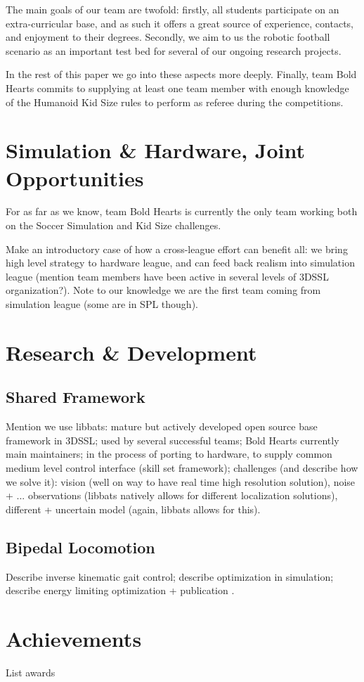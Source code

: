 \documentclass{llncs}
\begin{document}
The main goals of our team are twofold: firstly, all students
participate on an extra-curricular base, and as such it offers a great
source of experience, contacts, and enjoyment to their
degrees. Secondly, we aim to us the robotic football scenario as an
important test bed for several of our ongoing research projects.

In the rest of this paper we go into these aspects more
deeply. Finally, team Bold Hearts commits to supplying at least one
team member with enough knowledge of the Humanoid Kid Size rules to
perform as referee during the competitions.

\section{Simulation \& Hardware, Joint Opportunities}
\label{sec:simul-amp-hardw}

For as far as we know, team Bold Hearts is currently the only team
working both on the Soccer Simulation and Kid Size challenges. 

Make an introductory case of how a cross-league effort can benefit
all: we bring high level strategy to hardware league, and can feed
back realism into simulation league (mention team members have been
active in several levels of 3DSSL organization?). Note to our
knowledge we are the first team coming from simulation league (some
are in SPL though).

\section{Research \& Development}
\label{sec:research}

\subsection{Shared Framework}
\label{sec:framework}

Mention we use libbats: mature but actively developed open source base
framework in 3DSSL; used by several successful teams; Bold Hearts
currently main maintainers; in the process of porting to hardware, to
supply common medium level control interface (skill set framework);
challenges (and describe how we solve it): vision (well on way to have
real time high resolution solution), noise + ... observations (libbats
natively allows for different localization solutions), different +
uncertain model (again, libbats allows for this).

\subsection{Bipedal Locomotion}
\label{sec:bipedal-locomotion}

Describe inverse kinematic gait control; describe optimization in
simulation; describe energy limiting optimization + publication
\cite{lattarulo_application_2011}.

\section{Achievements}
\label{sec:achievements}

List awards



\end{document}
